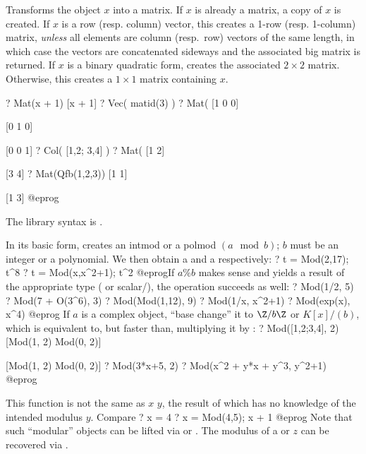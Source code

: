 \label{se:Mat}
Transforms the object $x$ into a matrix.
If $x$ is already a matrix, a copy of $x$ is created.
If $x$ is a row (resp. column) vector, this creates a 1-row (resp.
1-column) matrix, \emph{unless} all elements are column (resp.~row) vectors
of the same length, in which case the vectors are concatenated sideways
and the associated big matrix is returned.
If $x$ is a binary quadratic form, creates the associated $2\times 2$
matrix. Otherwise, this creates a $1\times 1$ matrix containing $x$.

\bprog
? Mat(x + 1)
[x + 1]
? Vec( matid(3) )
? Mat(%
[1 0 0]

[0 1 0]

[0 0 1]
? Col( [1,2; 3,4] )
? Mat(%
[1 2]

[3 4]
? Mat(Qfb(1,2,3))
[1 1]

[1 3]
@eprog

The library syntax is .

\label{se:Mod}
In its basic form, creates an intmod or a polmod $(a \mod b)$; $b$ must
be an integer or a polynomial. We then obtain a  and a
 respectively:
\bprog
? t = Mod(2,17); t^8
? t = Mod(x,x^2+1); t^2
@eprog\noindent If $a \% b$ makes sense and yields a result of the
appropriate type ( or scalar/), the operation succeeds as
well:
\bprog
? Mod(1/2, 5)
? Mod(7 + O(3^6), 3)
? Mod(Mod(1,12), 9)
? Mod(1/x, x^2+1)
? Mod(exp(x), x^4)
@eprog
If $a$ is a complex object, ``base change'' it to $\Z/b\Z$ or $K[x]/(b)$,
which is equivalent to, but faster than, multiplying it by :
\bprog
? Mod([1,2;3,4], 2)
[Mod(1, 2) Mod(0, 2)]

[Mod(1, 2) Mod(0, 2)]
? Mod(3*x+5, 2)
? Mod(x^2 + y*x + y^3, y^2+1)
@eprog

This function is not the same as $x$ \kbd{\%} $y$, the result of which
has no knowledge of the intended modulus $y$. Compare
\bprog
? x = 4 %
? x = Mod(4,5); x + 1
@eprog Note that such ``modular'' objects can be lifted via  or
. The modulus of a  or  $z$ can
be recovered via .


